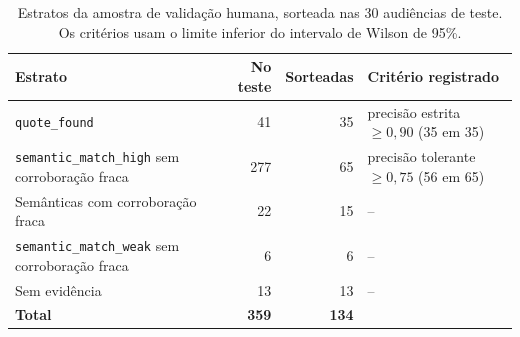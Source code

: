 \begin{table}[!htb]
  \centering
  \caption{Estratos da amostra de validação humana, sorteada nas 30 audiências de teste. Os critérios
  usam o limite inferior do intervalo de Wilson de 95\%.}
  \label{tab:amostra}
  \small
  \begin{tabularx}{\textwidth}{@{}Xrrl@{}}
    \toprule
    \textbf{Estrato} & \textbf{No teste} & \textbf{Sorteadas} & \textbf{Critério registrado} \\
    \midrule
    \texttt{quote\_found}                                   &  41 &  35 & precisão estrita $\geq 0{,}90$ (35 em 35) \\
    \texttt{semantic\_match\_high} sem corroboração fraca   & 277 &  65 & precisão tolerante $\geq 0{,}75$ (56 em 65) \\
    Semânticas com corroboração fraca                       &  22 &  15 & -- \\
    \texttt{semantic\_match\_weak} sem corroboração fraca   &   6 &   6 & -- \\
    Sem evidência                                           &  13 &  13 & -- \\
    \midrule
    \textbf{Total}                                          & \textbf{359} & \textbf{134} & \\
    \bottomrule
  \end{tabularx}
\end{table}
